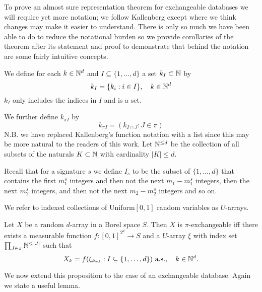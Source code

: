 To prove an almost sure representation theorem for exchangeable databases we will require yet more notation; we follow Kallenberg except where we think changes may make it easier to understand.
There is only so much we have been able to do to reduce the notational burden so we provide corollaries of the theorem after its statement and proof to demonstrate that behind the notation are some fairly intuitive concepts.

We define for each $k \in \mathbb{N}^d$ and $I \subseteq \{1,\ldots,d\}$ a set $k_I \subset \mathbb{N}$ by
\begin{equation}
k_I = \{k_i: i \in I\}, \quad k \in \mathbb{N}^d
\end{equation}
\ie $k_I$ only includes the indices in $I$ and is a set.

We further define $k_{\pi I}$ by
\begin{equation}
  k_{\pi I} = (k_{I \cap J} : J \in \pi)
\end{equation}
N.B. we have replaced Kallenberg's function notation with a list since this may be more natural to the readers of this work.
Let $\mathbb{N}^{\leq d}$ be the collection of all subsets of the naturals $K \subset \mathbb{N}$ with cardinality $|K| \leq d$.

Recall that for a signature $s$ we define $I_s$ to be the subset of $\{1,\ldots,d\}$ that contains the first $m_1^s$ integers and then not the next $m_1 - m_1^s$ integers, then the next $m_2^s$ integers, and then not the next $m_2 - m_2^s$ integers and so on.

We refer to indexed collections of \iid Uniform$[0,1]$ random variables as $U$-arrays.

\begin{prop}
\label{prop:piexas}
  Let $X$ be a random $d$-array in a Borel space $S$.
  Then $X$ is $\pi$-exchangeable iff there exists a measurable function $f:[0,1]^{2^d}\to S$ and a $U$-array $\xi$ with index set $\prod_{J\in\pi} \mathbb{N}^{\leq |J|}$ such that
  \begin{equation}
    X_k = f(\xi_{k_{\pi I}} : I \subseteq \{1,\ldots,d\}) \ \textrm{a.s.}, \quad k \in \mathbb{N}^d.
    \label{eq:piexas}
  \end{equation}
\end{prop}

We now extend this proposition to the case of an exchangeable database.
Again we state a useful lemma.

